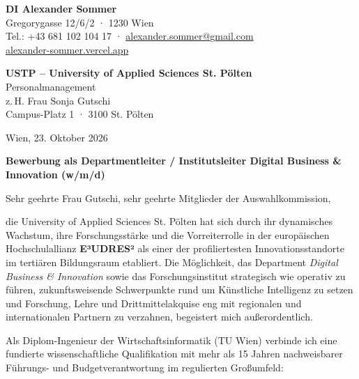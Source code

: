 \documentclass[10.5pt]{article}
\begin{document}
\begin{minipage}[t]{0.56\textwidth}
  \textbf{\color{accent}\large DI Alexander Sommer}\\[1pt]
  Gregorygasse 12/6/2 · 1230 Wien\\[1pt]
  Tel.: +43 681 102 104 17 · \href{mailto:alexander.sommer@gmail.com}{alexander.sommer@gmail.com}\\[1pt]
  \href{https://alexander-sommer.vercel.app}{alexander-sommer.vercel.app}
\end{minipage}\hfill
\begin{minipage}[t]{0.42\textwidth}\raggedleft
  \textbf{USTP – University of Applied Sciences St. Pölten}\\
  Personalmanagement\\
  z.\,H. Frau Sonja Gutschi\\
  Campus-Platz 1 · 3100 St. Pölten
\end{minipage}

\vspace{8pt}
\hfill Wien, 23. Oktober 2026

\vspace{2pt}
{\large\bfseries\color{brandblue}Bewerbung als Departmentleiter / Institutsleiter Digital Business \& Innovation (w/m/d)}
\vspace{1pt}

\vspace{4pt}
Sehr geehrte Frau Gutschi, sehr geehrte Mitglieder der Auswahlkommission,

die University of Applied Sciences St. Pölten hat sich durch ihr dynamisches Wachstum, ihre Forschungsstärke und die Vorreiterrolle in der europäischen Hochschulallianz \textbf{E³UDRES²} als einer der profiliertesten Innovationsstandorte im tertiären Bildungsraum etabliert. Die Möglichkeit, das Department \emph{Digital Business \& Innovation} sowie das Forschungsinstitut strategisch wie operativ zu führen, zukunftsweisende Schwerpunkte rund um Künstliche Intelligenz zu setzen und Forschung, Lehre und Drittmittelakquise eng mit regionalen und internationalen Partnern zu verzahnen, begeistert mich außerordentlich.

Als Diplom-Ingenieur der Wirtschaftsinformatik (TU Wien) verbinde ich eine fundierte wissenschaftliche Qualifikation mit mehr als 15 Jahren nachweisbarer Führungs- und Budgetverantwortung im regulierten Großumfeld:
\end{document}
